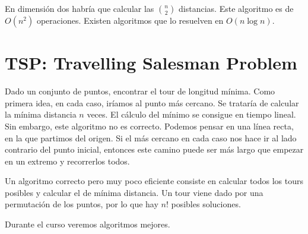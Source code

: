 \documentclass[AL.tex]{subfiles}
\begin{document}
En dimensión dos habría que calcular las $\binom{n}{2}$ distancias. Este algoritmo es de $O(n^2)$ operaciones. Existen algoritmos que lo resuelven en $O(n\log n)$. 


\section{TSP: Travelling Salesman Problem}
Dado un conjunto de puntos, encontrar el tour de longitud mínima. Como primera idea, en cada caso, iríamos al punto más cercano. Se trataría de calcular la mínima distancia $n$ veces. El cálculo del mínimo se consigue en tiempo lineal. Sin embargo, este algoritmo no es correcto. Podemos pensar en una línea recta, en la que partimos del origen. Si el más cercano en cada caso nos hace ir al lado contrario del punto inicial, entonces este camino puede ser más largo que empezar en un extremo y recorrerlos todos. 


Un algoritmo correcto pero muy poco eficiente consiste en calcular todos los tours posibles y calcular el de mínima distancia. Un tour viene dado por una permutación de los puntos, por lo que hay $n!$ posibles soluciones. 

Durante el curso veremos algoritmos mejores.
\end{document}
